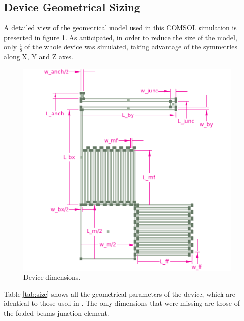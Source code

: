 \documentclass[lettersize,journal]{IEEEtran}
\begin{document}
        \subsection{Device Geometrical Sizing}
        A detailed view of the geometrical model used in this COMSOL simulation is presented in figure \ref{fig:dev_quotes}. As anticipated, in order to reduce the size of the model, only \(\frac{1}{8}\) of the whole device was simulated, taking advantage of the symmetries along X, Y and Z axes.
        
        \begin{figure}[h!]
            \centering
            \includegraphics[width=1.0\linewidth]{device_size.png}
            \caption{Device dimensions.}
            \label{fig:dev_quotes}
        \end{figure}
        
        Table \ref{tab:size} shows all the geometrical parameters of the device, which are identical to those used in \cite{original}. The only dimensions that were missing are those of the folded beams junction element.
        
\end{document}

